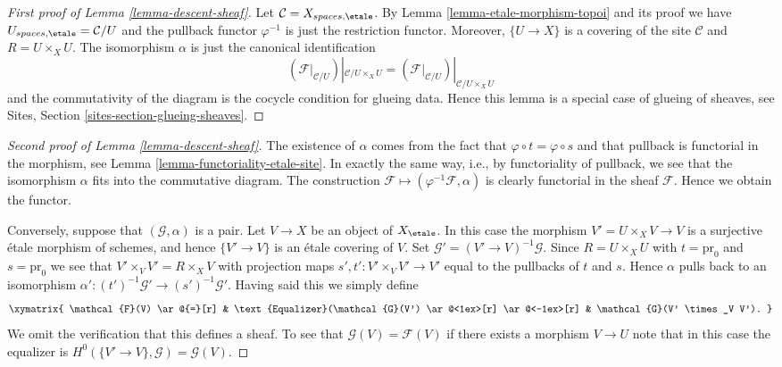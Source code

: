 \begin{proof}[First proof of Lemma \ref{lemma-descent-sheaf}]
Let $\mathcal{C} = X_{spaces, \etale}$. By
Lemma \ref{lemma-etale-morphism-topoi}
and its proof we have $U_{spaces, \etale} = \mathcal{C}/U$
and the pullback functor $\varphi^{-1}$ is just the restriction functor.
Moreover, $\{U \to X\}$ is a covering of the site $\mathcal{C}$ and
$R = U \times_X U$. The isomorphism $\alpha$ is just the canonical
identification
$$
\left(\mathcal{F}|_{\mathcal{C}/U}\right)|_{\mathcal{C}/U \times_X U}
=
\left(\mathcal{F}|_{\mathcal{C}/U}\right)|_{\mathcal{C}/U \times_X U}
$$
and the commutativity of the diagram is the cocycle condition for glueing
data. Hence this lemma is a special case of glueing of sheaves, see
Sites, Section \ref{sites-section-glueing-sheaves}.
\end{proof}

\begin{proof}[Second proof of Lemma \ref{lemma-descent-sheaf}]
The existence of $\alpha$ comes from the fact that
$\varphi \circ t = \varphi \circ s$ and that pullback is
functorial in the morphism, see
Lemma \ref{lemma-functoriality-etale-site}.
In exactly the same way, i.e., by functoriality of pullback, we see
that the isomorphism $\alpha$ fits into the commutative diagram.
The construction $\mathcal{F} \mapsto (\varphi^{-1}\mathcal{F}, \alpha)$
is clearly functorial in the sheaf $\mathcal{F}$.
Hence we obtain the functor.

\medskip\noindent
Conversely, suppose that $(\mathcal{G}, \alpha)$ is a pair.
Let $V \to X$ be an object of $X_\etale$.
In this case the morphism $V' = U \times_X V \to V$ is a surjective \'etale
morphism of schemes, and hence $\{V' \to V\}$ is an \'etale
covering of $V$. Set $\mathcal{G}' = (V' \to V)^{-1}\mathcal{G}$.
Since $R = U \times_X U$ with $t = \text{pr}_0$
and $s = \text{pr}_0$ we see that $V' \times_V V' = R \times_X V$
with projection maps $s', t' : V' \times_V V' \to V'$ equal to the pullbacks
of $t$ and $s$. Hence $\alpha$ pulls back to an isomorphism
$\alpha' : (t')^{-1}\mathcal{G}' \to (s')^{-1}\mathcal{G}'$. Having said this
we simply define
$$
\xymatrix{
\mathcal{F}(V) \ar@{=}[r] &
\text{Equalizer}(\mathcal{G}(V') \ar@<1ex>[r] \ar@<-1ex>[r] &
\mathcal{G}(V' \times_V V').
}
$$
We omit the verification that this defines a sheaf. To see that
$\mathcal{G}(V) = \mathcal{F}(V)$ if there exists a morphism $V \to U$
note that in this case the equalizer is
$H^0(\{V' \to V\}, \mathcal{G}) = \mathcal{G}(V)$.
\end{proof}







